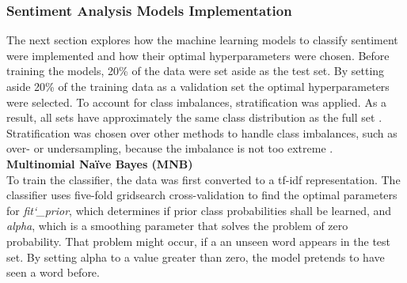 \documentclass[11pt, a4paper]{article}
\begin{document}
\subsubsection{Sentiment Analysis Models Implementation}
The next section explores how the machine learning models to classify sentiment were implemented and how their optimal hyperparameters were chosen.
Before training the models, 20\% of the data were set aside as the test set. By setting aside 20\% of the training data as a validation set 
the optimal hyperparameters were selected. To account for class imbalances, stratification was applied. As a result, all sets have approximately the same
class distribution as the full set \citep{sahu2017stratification}.
Stratification was chosen over other methods to handle class imbalances, such as over- or undersampling, because the imbalance
is not too extreme \citep{ganganwar2012overview}.\\

\noindent\textbf{Multinomial Naïve Bayes (MNB)}\\
To train the classifier, the data was first converted to a tf-idf representation.
The classifier uses five-fold gridsearch cross-validation to find the optimal parameters for
\emph{fit\char`_prior}, which determines if prior class probabilities shall be learned, and \emph{alpha}, which is a smoothing parameter that solves
the problem of zero probability. That problem might occur, if a an unseen word appears in the test set. By setting alpha to a value greater than
zero, the model pretends to have seen a word before.\\
\end{document}
